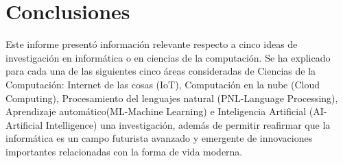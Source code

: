 \documentclass[10pt,journal]{IEEEtran}
\begin{document}
\section{\textbf{Conclusiones}}
Este informe presentó información relevante respecto a cinco ideas de investigación en informática o en ciencias de la computación. Se ha explicado para cada una de las siguientes cinco áreas consideradas de Ciencias de la Computación: Internet de las cosas (IoT), Computación en la nube (Cloud Computing), Procesamiento del lenguajes natural (PNL-Language Processing), Aprendizaje automático(ML-Machine Learning) e Inteligencia Artificial (AI-Artificial Intelligence) una investigación, además de permitir reafirmar que la informática es un campo futurista avanzado y emergente de innovaciones importantes relacionadas con la forma de vida moderna. 
\medskip

\end{document}

